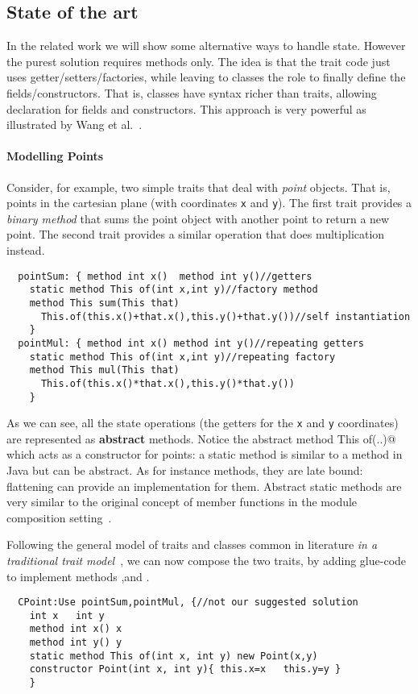 \subsection{State of the art}
In the related work we will show some alternative ways to handle
state.  However the purest solution requires methods only. The idea is
that the trait code just uses getter/setters/factories, while leaving
to classes the role to finally define the fields/constructors. That
is, classes have syntax richer than traits, allowing
declaration for fields and constructors.  This approach is very
powerful as illustrated by Wang et al.~\cite{wang2016classless}.

\paragraph{Modelling Points} Consider, for example, two simple 
traits that deal with \emph{point} objects. That is, points
in the cartesian plane (with coordinates \lstinline{x} and
\lstinline{y}). The first trait provides a \emph{binary method} that 
sums the point object with another point to return a new point. 
The second trait provides a similar operation that does multiplication 
instead.
\saveSpace 
\begin{lstlisting}
  pointSum: { method int x()  method int y()//getters
    static method This of(int x,int y)//factory method
    method This sum(This that)
      This.of(this.x()+that.x(),this.y()+that.y())//self instantiation
    }
  pointMul: { method int x() method int y()//repeating getters
    static method This of(int x,int y)//repeating factory
    method This mul(This that)
      This.of(this.x()*that.x(),this.y()*that.y())
    }
\end{lstlisting}
\saveSpace
\noindent As we can see, all the state operations (the getters for the 
\lstinline{x} and \lstinline{y} coordinates) are represented as {\bf abstract} methods.
Notice the abstract \Q@static method This of(..)@ which acts as a constructor
for points:
a static method is similar to a \Q@static@ method in Java but can be abstract. 
As for instance methods, they are late bound:  flattening can provide an implementation for them.
Abstract static methods are very similar to the original concept of member functions in the module composition setting~\cite{ancona2002calculus}.

Following the general model of traits and classes common in literature \emph{in a traditional trait model}~\cite{Traits:ECOOP2003},
we can now compose the two traits, by adding glue-code
to implement methods \Q@x@,\Q@y@ and \Q@of@.
\begin{lstlisting}
  CPoint:Use pointSum,pointMul, {//not our suggested solution
    int x   int y
    method int x() x       
    method int y() y
    static method This of(int x, int y) new Point(x,y)
    constructor Point(int x, int y){ this.x=x   this.y=y }
    }
\end{lstlisting}


